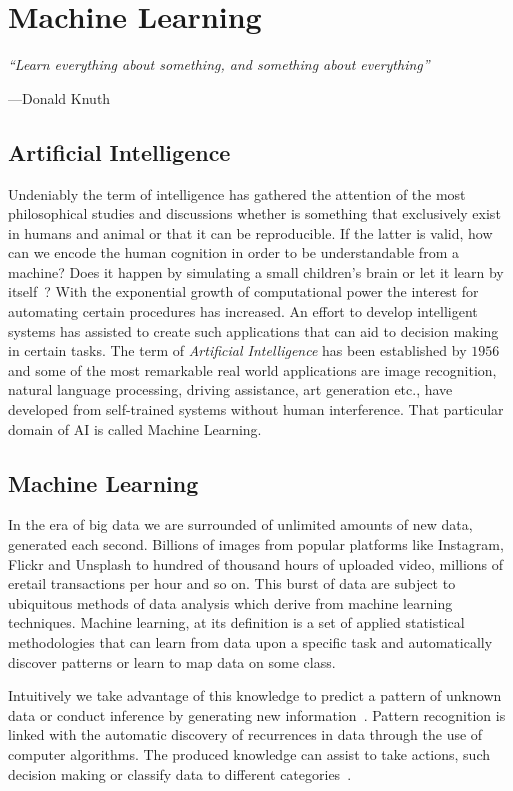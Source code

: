 \chapter{Machine Learning}
\label{c3:intro}

\thispagestyle{empty}
\epigraph{\itshape ``Learn everything about something, and something about everything''}
{---Donald Knuth}

\section{Artificial Intelligence}

Undeniably the term of intelligence has gathered the attention of the most philosophical studies and discussions whether is something that exclusively exist in humans and animal or that it can be reproducible. If the latter is valid, how can we encode the human cognition in order to be understandable from a machine? Does it happen by simulating a small children's brain or let it learn by itself~\cite{turing1950computing}?
With the exponential growth of computational power the interest for automating certain procedures has increased. An effort to develop intelligent systems has assisted to create such applications that can aid to decision making in certain tasks. The term of \textit{Artificial Intelligence} has been established by $1956$ and some of the most remarkable real world applications are image recognition, natural language processing, driving assistance, art generation etc., have developed from self-trained systems without human interference. That particular domain of AI is called Machine Learning.


\section{Machine Learning}
\label{c3:ml}
In the era of big data we are surrounded of unlimited amounts of new data, generated each second. Billions of images from popular platforms like Instagram, Flickr and Unsplash to hundred of thousand hours of uploaded video, millions of eretail transactions per hour and so on.
This burst of data are subject to ubiquitous methods of data analysis which derive from machine learning techniques.
Machine learning, at its definition is a set of applied statistical methodologies that can learn from data upon a specific task and automatically discover patterns or learn to map data on some class.

Intuitively we take advantage of this knowledge to predict a pattern of unknown data or conduct inference by generating new information~\cite{murphy2012machine}.
Pattern recognition is linked with the automatic discovery of recurrences in data through the use of computer algorithms. The produced knowledge can assist to take actions, such decision making or classify data to different categories~\cite{bishop2006pattern}.

